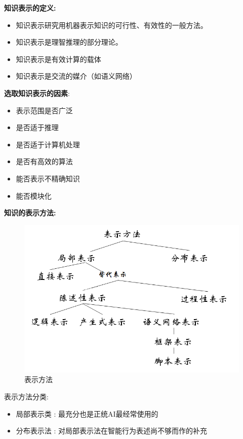 \documentclass[UTF8,a4paper]{ctexart}
\begin{document}
\textbf{知识表示的定义:}
\begin{itemize}
	\item 知识表示研究用机器表示知识的可行性、有效性的一般方法。
	\item 知识表示是理智推理的部分理论。
	\item 知识表示是有效计算的载体
	\item 知识表示是交流的媒介（如语义网络）
\end{itemize}

\textbf{选取知识表示的因素}:
\begin{itemize}
	\item 表示范围是否广泛
	\item 是否适于推理
	\item 是否适于计算机处理
	\item 是否有高效的算法
	\item 能否表示不精确知识
	\item 能否模块化
\end{itemize}


\textbf{知识的表示方法:}

\begin{figure}[H]
	\centering
	\includegraphics[scale = 0.3]{assets/ArtificialIntelligence_9d3f2.png}
	\caption{表示方法}
\end{figure}

表示方法分类:
\begin{itemize}
	\item 局部表示类 : 最充分也是正统AI最经常使用的
	\item 分布表示法 : 对局部表示法在智能行为表述尚不够而作的补充
\end{itemize}
\end{document}

